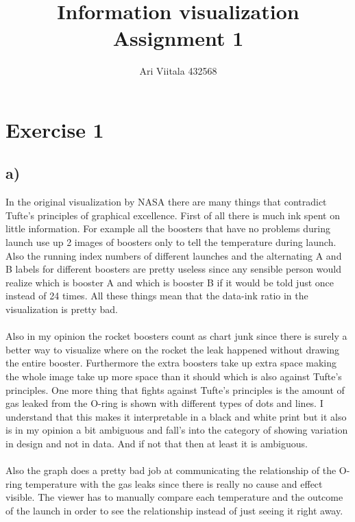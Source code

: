 \documentclass[a4paper,10pt]{article}
\begin{document}
\title{Information visualization \\ Assignment 1}
\author{Ari Viitala 432568}
\maketitle

\section*{Exercise 1}
\subsection*{a)}
In the original visualization by NASA there are many things that contradict Tufte's principles of graphical excellence. First of all there is much ink spent on little information. For example all the boosters that have no problems during launch use up 2 images of boosters only to tell the temperature during launch. Also the running index numbers of different launches and the alternating A and B labels for different boosters are pretty useless since any sensible person would realize which is booster A and which is booster B if it would be told just once instead of 24 times. All these things mean that the data-ink ratio in the visualization is pretty bad. 
\\\\
Also in my opinion the rocket boosters count as chart junk since there is surely a better way to visualize where on the rocket the leak happened without drawing the entire booster. Furthermore the extra boosters take up extra space making the whole image take up more space than it should which is also against Tufte's principles. One more thing that fights against Tufte's principles is the amount of gas leaked from the O-ring is shown with different types of dots and lines. I understand that this makes it interpretable in a black and white print but it also is in my opinion a bit ambiguous and fall's into the category of showing variation in design and not in data. And if not that then at least it is ambiguous.
\\\\
Also the graph does a pretty bad job at communicating the relationship of the O-ring temperature with the gas leaks since there is really no cause and effect visible. The viewer has to manually compare each temperature and the outcome of the launch in order to see the relationship instead of just seeing it right away. 
\end{document}
